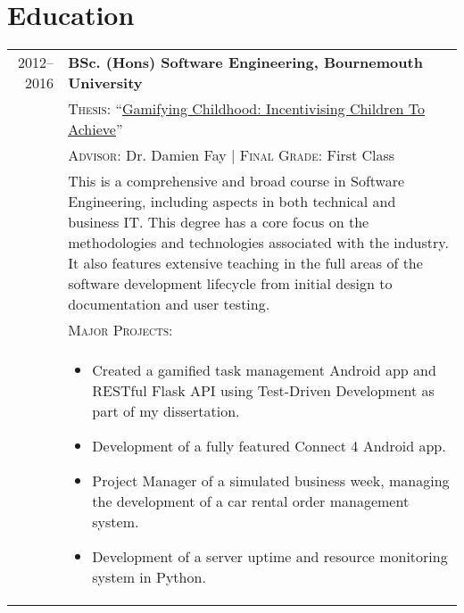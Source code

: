 \section{Education}\label{sec:education}
\begin{tabular}{r|p{11cm}}
    2012--2016 & \textbf{BSc. (Hons) Software Engineering, Bournemouth University}\\
    & \textsc{Thesis}: ``\href{https://github.com/mikeporterdev/Dissertation/blob/master/digitalmain.pdf}{Gamifying Childhood: Incentivising Children To Achieve}'' \\
    & \textsc{Advisor}: Dr. Damien Fay | \normalsize \textsc{Final Grade}: First Class \\
    & \small This is a comprehensive and broad course in Software Engineering, including aspects in both technical and business IT. This degree has a core focus on the methodologies and technologies associated with the industry.
    It also features extensive teaching in the full areas of the software development lifecycle from initial design to documentation and user testing. \\
    & \vspace{1pt} \textsc{Major Projects}: \\
    & \vspace{-0.9em}\begin{itemize}[itemsep=0pt,topsep=0pt,leftmargin=*]
                         \small
                         \item Created a gamified task management Android app and RESTful Flask API using Test-Driven Development as part of my dissertation.
                         \item Development of a fully featured Connect 4 Android app.
                         \item Project Manager of a simulated business week, managing the development of a car rental order management system.
                         \item Development of a server uptime and resource monitoring system in Python.
    \end{itemize}\vspace{-1.5em}

\end{tabular}